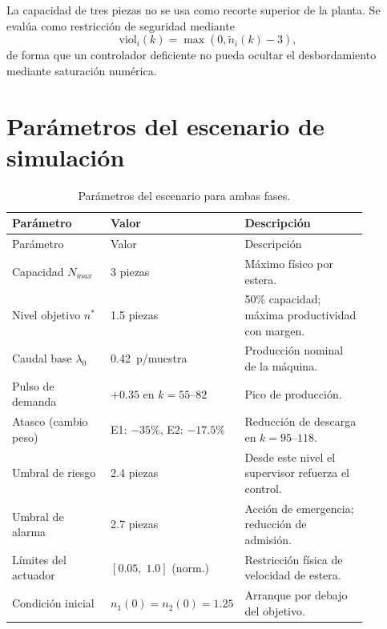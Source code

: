 La capacidad de tres piezas no se usa como recorte superior de la planta. Se evalúa como restricción de seguridad mediante
\[
\text{viol}_i(k)=\max\!\left(0,\tilde n_i(k)-3\right),
\]
de forma que un controlador deficiente no pueda ocultar el desbordamiento mediante saturación numérica.

\section{Parámetros del escenario de simulación}

\begin{longtable}{@{}P{0.30\linewidth}P{0.20\linewidth}P{0.38\linewidth}@{}}
\caption{Parámetros del escenario para ambas fases.}
\label{tab:parametros_escenario}\\
\toprule
Parámetro & Valor & Descripción \\ \midrule \endfirsthead
\toprule Parámetro & Valor & Descripción \\ \midrule \endhead
Capacidad $N_{max}$ & 3 piezas & Máximo físico por estera.\\
Nivel objetivo $n^*$ & 1.5 piezas & 50\% capacidad; máxima productividad con margen.\\
Caudal base $\lambda_0$ & 0.42~p/muestra & Producción nominal de la máquina.\\
Pulso de demanda & $+0.35$ en $k=55$--$82$ & Pico de producción.\\
Atasco (cambio peso) & E1: $-35\%$, E2: $-17.5\%$ & Reducción de descarga en $k=95$--$118$.\\
Umbral de riesgo & 2.4 piezas & Desde este nivel el supervisor refuerza el control.\\
Umbral de alarma & 2.7 piezas & Acción de emergencia; reducción de admisión.\\
Límites del actuador & $[0.05,\;1.0]$ (norm.) & Restricción física de velocidad de estera.\\
Condición inicial & $n_1(0)=n_2(0)=1.25$ & Arranque por debajo del objetivo.\\
\bottomrule
\end{longtable}
